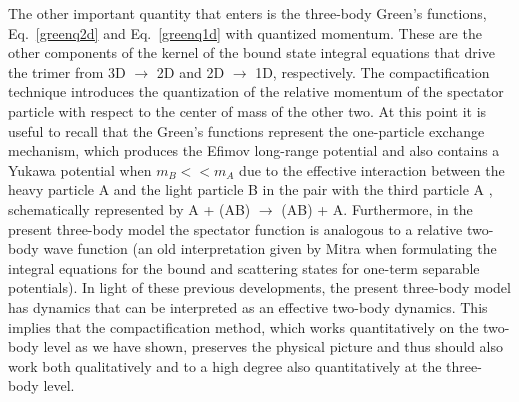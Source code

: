 \documentclass[twocolumn,showpacs,aps,prl,10pt]{revtex4}
\begin{document}
The other important quantity that enters is the three-body Green's functions, 
Eq.~\eqref{greenq2d} and Eq.~\eqref{greenq1d} with quantized momentum. These are the other components of the kernel of 
the bound state integral equations that drive the trimer from 3D $\to$ 2D and 2D $\to$ 1D, respectively. The 
compactification technique introduces the quantization of the relative momentum of the spectator particle with 
respect to the center of mass of the other two. 
At this point it is useful to recall that the Green's functions represent the 
one-particle exchange mechanism, which produces the Efimov long-range potential and also contains a Yukawa
potential when $m_B<<m_A$ due to the effective interaction between the heavy particle A and the light particle B in the pair with the third 
particle A \cite{fonseca}, schematically represented by A + (AB) $\to$ (AB) + A. 
Furthermore, in the present three-body model the
spectator function is analogous to a relative two-body wave function (an old interpretation given by Mitra \cite{mitra} when formulating
the integral equations for the bound and scattering states for one-term separable potentials). 
In light of these previous developments, 
the present three-body
model has dynamics that can be interpreted as an effective two-body dynamics. This implies that the compactification method, which works quantitatively on the two-body level as we have shown, preserves the physical picture and thus should also work both qualitatively and to a high degree also quantitatively at the three-body level. 
 
\end{document}
